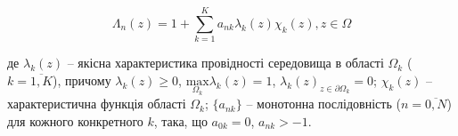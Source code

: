 \begin{equation}
\label{eqn:teploprovidnist_9}
\Lambda_{n}{(z) = {1 + {\sum\limits_{k = 1}^{K}{a_{\mathit{\text{nk}}}\lambda_{k}(z)\chi_{k}(z)}}}}, z\in\Omega
\end{equation}
    
де $\lambda_{k}(z)$ -- якісна характеристика
провідності середовища в області $\Omega_k$ ($k = \overline{1,K}$), причому
$\lambda_{k}{(z) \geq 0}$, $\underset{\Omega_{k}}{\text{max}}\lambda_{k}(z){= 1}$,
$\lambda_{k}(z)_{z\in\partial\Omega_{k}} = 0$; $\chi_{k}(z)$ -- характеристична функція області
$\Omega_k$; $\{ a_{nk}\}$ -- монотонна послідовність ($n = \overline{0,N}$) для кожного
конкретного $k$, така, що $a_{0k} = 0$,
$a_{\mathit{\text{nk}}} > {- 1}$.






